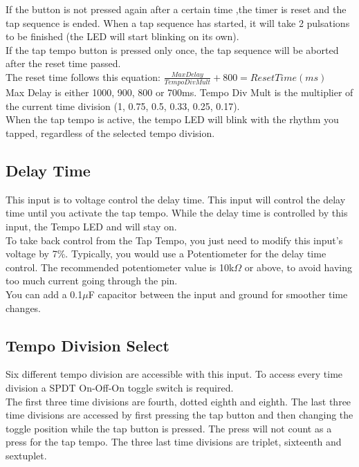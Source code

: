 \documentclass[a4paper, 10pt]{article}
\begin{document}
If the button is not pressed again after a certain time ,the timer is reset and the tap sequence is ended. When a tap sequence has started, it will take 2 pulsations to be finished (the LED will start blinking on its own).\\

If the tap tempo button is pressed only once, the tap sequence will be aborted after the reset time passed.\\
The reset time follows this equation: $\frac{Max Delay}{Tempo Div Mult} + 800 = Reset Time (ms)$\\

Max Delay is either 1000, 900, 800 or 700ms. Tempo Div Mult is the multiplier of the current time division (1, 0.75, 0.5, 0.33, 0.25, 0.17).\\

When the tap tempo is active, the tempo LED will blink with the rhythm you tapped, regardless of the selected tempo division.\\

\subsection{Delay Time}
\label{subsec:delaytime}
\bigbreak
This input is to voltage control the delay time. This input will control the delay time until you activate the tap tempo. While the delay time is controlled by this input, the Tempo LED and will stay on.\\

To take back control from the Tap Tempo, you just need to modify this input's voltage by 7\%. Typically, you would use a Potentiometer for the delay time control. The recommended potentiometer value is 10k$\Omega$ or above, to avoid having too much current going through the pin.\\

You can add a 0.1$\mu$F capacitor between the input and ground for smoother time changes.\\

\subsection{Tempo Division Select}
\label{subsec:tempodiv}
\bigbreak
Six different tempo division are accessible with this input. To access every time division a SPDT On-Off-On toggle switch is required.\\

The first three time divisions are fourth, dotted eighth and eighth. The last three time divisions are accessed by first pressing the tap button and then changing the toggle position while the tap button is pressed. The press will not count as a press for the tap tempo. The three last time divisions are triplet, sixteenth and sextuplet.\\
\end{document}
